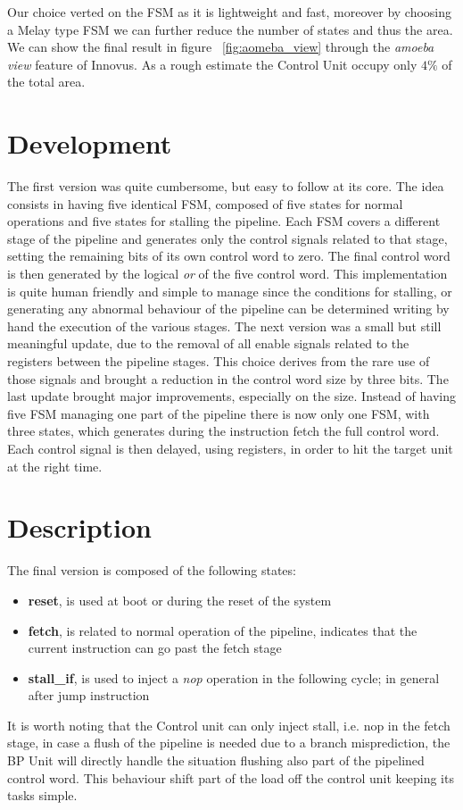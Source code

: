 Our choice verted on the FSM as it is lightweight and fast, moreover by choosing
a Melay type FSM we can further reduce the number of states and thus the area.
We can show the final result in figure ~\ref{fig:aomeba_view} through the 
\textit{amoeba view} feature of Innovus. As a rough estimate the Control Unit 
occupy only $4 \%$ of the total area.

\section{Development}
The first version was quite cumbersome, but easy to follow at its core. The idea
consists in having five identical FSM, composed of five states 
for normal operations and five states for stalling the pipeline. Each FSM
covers a different stage of the pipeline and generates only the control signals
related to that stage, setting the remaining bits of its own control word to
zero. The final control word is then generated by the logical \textit{or} of 
the five control word. This implementation is quite human friendly and simple 
to manage since the conditions for stalling, or generating any abnormal 
behaviour of the pipeline can be determined writing by hand the execution 
of the various stages.
The next version was a small but still meaningful update, due to the removal 
of all enable signals related to the registers between the pipeline stages.
This choice derives from the rare use of those signals and brought a reduction
in the control word size by three bits.
The last update brought major improvements, especially on the size.
Instead of having five FSM managing one part of the pipeline there is now only 
one FSM, with three states, which generates during the instruction fetch the 
full control word. Each control signal is then delayed, using registers, in 
order to hit the target unit at the right time. 

\section{Description} 
The final version is composed of the following states:

\begin{itemize}
	\item \textbf{reset}, is used at boot or during the reset of the system 
	\item \textbf{fetch}, is related to normal operation of the pipeline,
	      indicates that the current instruction can go past the fetch stage
	\item \textbf{stall\_if}, is used to inject a \textit{nop} operation in the
	      following cycle; in general after jump instruction
\end{itemize} 
It is worth noting that the Control unit can only inject stall, i.e. nop in the
fetch stage, in case a flush of the pipeline is needed due to a branch
misprediction, the BP Unit will directly handle the situation flushing also part
of the pipelined control word. This behaviour shift part of the load off the 
control unit keeping its tasks simple.


